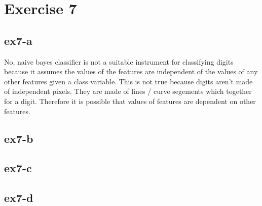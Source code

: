 \section{Exercise 7}
\subsection{ex7-a}
No, naive bayes classifier is not a suitable instrument for classifying digits because it assumes the values of the
features are independent of the values of any other features given a class variable. This is not true because digits
aren't made of independent pixels. They are made of lines / curve segements which together for a digit. Therefore it
is possible that values of features are dependent on other features.

\subsection{ex7-b}

\subsection{ex7-c}

\subsection{ex7-d}
